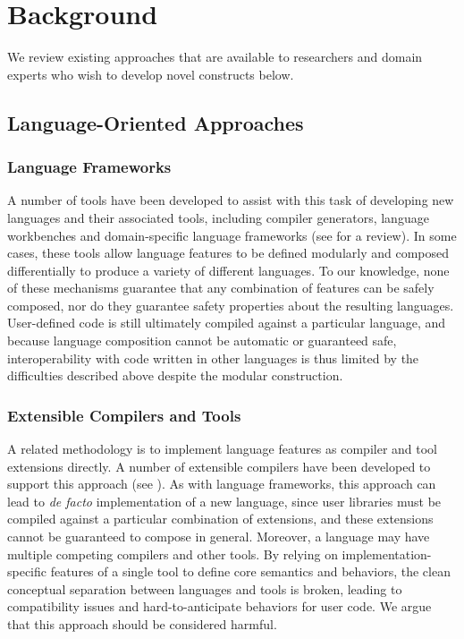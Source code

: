 \section{Background}
We review existing approaches that are available to researchers and domain experts who wish to develop novel constructs below.

\subsection{Language-Oriented Approaches}
\subsubsection{Language Frameworks}
A number of tools have been developed to assist with this task of developing new languages and their associated tools, including compiler generators, language workbenches and domain-specific language frameworks (see \cite{fowler2010domain} for a review). In some cases, these tools allow language features to be defined modularly and composed differentially to produce a variety of different languages. To our knowledge, none of these mechanisms guarantee that any combination of features can be safely composed, nor do they guarantee safety properties about the resulting languages. User-defined code is still ultimately compiled against a particular language, and because language composition cannot be automatic or guaranteed safe, interoperability with code written in other languages is thus limited by the difficulties described above despite the modular construction.

\subsubsection{Extensible Compilers and Tools}
A related methodology is to implement language features as compiler and tool extensions directly. A number of extensible compilers have been developed to support this approach (see \cite{clements2008comparison}). As with language frameworks, this approach can lead to \emph{de facto} implementation of a new language, since user libraries must be compiled against a particular combination of extensions, and these extensions cannot be guaranteed to compose in general. Moreover, a language may have multiple competing compilers and other tools. By relying on implementation-specific features of a single tool to define core semantics and behaviors, the clean conceptual separation between languages and tools is broken, leading to compatibility issues and hard-to-anticipate behaviors for user code. We argue that this approach should be considered harmful.

